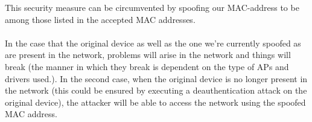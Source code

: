 This security measure can be circumvented by spoofing our MAC-address to be among those listed in the accepted MAC addresses. \\ \\In the case that the original device
as well as the one we're currently spoofed as are present in the network, problems will arise in the network and things will break (the manner in which they break is
dependent on the type of APs and drivers used.). In the second case, when the original device is no longer present in the network
(this could be ensured by executing a deauthentication attack on the original device), the attacker will be able to access the network using the spoofed MAC address.
